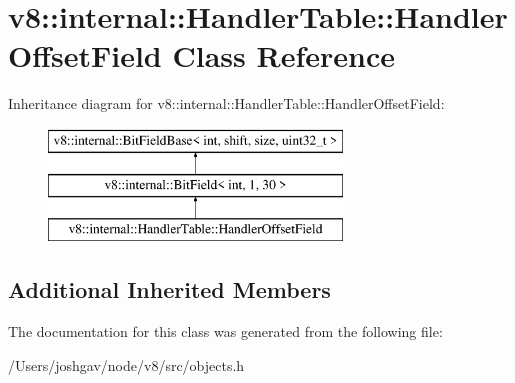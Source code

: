 \hypertarget{classv8_1_1internal_1_1_handler_table_1_1_handler_offset_field}{}\section{v8\+:\+:internal\+:\+:Handler\+Table\+:\+:Handler\+Offset\+Field Class Reference}
\label{classv8_1_1internal_1_1_handler_table_1_1_handler_offset_field}
Inheritance diagram for v8\+:\+:internal\+:\+:Handler\+Table\+:\+:Handler\+Offset\+Field\+:\begin{figure}[H]
\begin{center}
\leavevmode
\includegraphics[height=3.000000cm]{classv8_1_1internal_1_1_handler_table_1_1_handler_offset_field}
\end{center}
\end{figure}
\subsection*{Additional Inherited Members}


The documentation for this class was generated from the following file\+:\begin{DoxyCompactItemize}
\item 
/\+Users/joshgav/node/v8/src/objects.\+h\end{DoxyCompactItemize}
